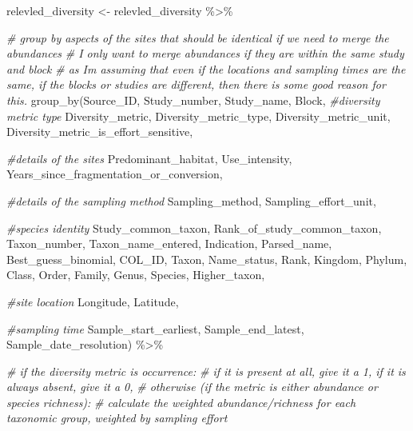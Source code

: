 \documentclass[
]{article}
\newenvironment{Shaded}{\begin{snugshade}}{\end{snugshade}}
\newcommand{\CommentTok}[1]{\textcolor[rgb]{0.56,0.35,0.01}{\textit{#1}}}
\newcommand{\FunctionTok}[1]{\textcolor[rgb]{0.00,0.00,0.00}{#1}}
\newcommand{\NormalTok}[1]{#1}
\newcommand{\OtherTok}[1]{\textcolor[rgb]{0.56,0.35,0.01}{#1}}
\newcommand{\SpecialCharTok}[1]{\textcolor[rgb]{0.00,0.00,0.00}{#1}}
\begin{document}
\begin{Shaded}
\begin{Highlighting}[]
\NormalTok{relevled\_diversity }\OtherTok{\textless{}{-}}\NormalTok{ relevled\_diversity }\SpecialCharTok{\%\textgreater{}\%}
  
  \CommentTok{\# group by aspects of the sites that should be identical if we need to merge the abundances}
  \CommentTok{\# I only want to merge abundances if they are within the same study and block}
  \CommentTok{\# as I\textquotesingle{}m assuming that even if the locations and sampling times are the same, if the blocks or studies are different, then there is some good reason for this.}
  \FunctionTok{group\_by}\NormalTok{(Source\_ID, Study\_number, Study\_name, Block,}
           \CommentTok{\#diversity metric type}
\NormalTok{           Diversity\_metric, Diversity\_metric\_type, Diversity\_metric\_unit,}
\NormalTok{           Diversity\_metric\_is\_effort\_sensitive,}
           
           \CommentTok{\#details of the sites}
\NormalTok{           Predominant\_habitat, Use\_intensity, Years\_since\_fragmentation\_or\_conversion,}
           
           \CommentTok{\#details of the sampling method}
\NormalTok{           Sampling\_method, Sampling\_effort\_unit,}
           
           \CommentTok{\#species identity}
\NormalTok{           Study\_common\_taxon, Rank\_of\_study\_common\_taxon,}
\NormalTok{           Taxon\_number, Taxon\_name\_entered,}
\NormalTok{           Indication, Parsed\_name,}
\NormalTok{           Best\_guess\_binomial, COL\_ID, Taxon, Name\_status,}
\NormalTok{           Rank, Kingdom, Phylum, Class, Order, Family, Genus, Species,}
\NormalTok{           Higher\_taxon,}
           
           \CommentTok{\#site location}
\NormalTok{           Longitude, Latitude,}
           
           \CommentTok{\#sampling time}
\NormalTok{           Sample\_start\_earliest, Sample\_end\_latest, Sample\_date\_resolution) }\SpecialCharTok{\%\textgreater{}\%}
  
  \CommentTok{\# if the diversity metric is occurrence:}
  \CommentTok{\#   if it is present at all, give it a 1, if it is always absent, give it a 0,}
  \CommentTok{\# otherwise (if the metric is either abundance or species richness):}
  \CommentTok{\#   calculate the weighted abundance/richness for each taxonomic group, weighted by sampling effort}
  

\end{Highlighting}
\end{Shaded}
\end{document}
